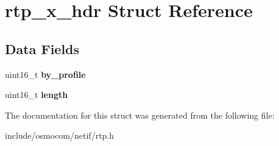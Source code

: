 \section{rtp\+\_\+x\+\_\+hdr Struct Reference}
\label{structrtp__x__hdr}
\subsection*{Data Fields}
\begin{DoxyCompactItemize}
\item 
uint16\+\_\+t {\bfseries by\+\_\+profile}\label{structrtp__x__hdr_ac7010901031514e7bd2db3f7b0f66fab}

\item 
uint16\+\_\+t {\bfseries length}\label{structrtp__x__hdr_acbdc44c4b61dde5e00daf23fcf50066c}

\end{DoxyCompactItemize}


The documentation for this struct was generated from the following file\+:\begin{DoxyCompactItemize}
\item 
include/osmocom/netif/rtp.\+h\end{DoxyCompactItemize}
